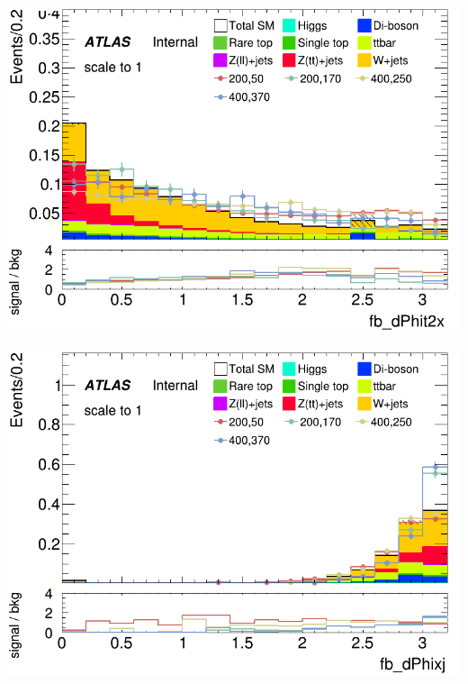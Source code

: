 \documentclass[usenames,dvipsnames]{beamer}
\begin{document}
\begin{frame}
    \begin{minipage}{0.32\textwidth}
        \centering
        \includegraphics[width=\textwidth]{graphics/LH_met_sig/LH_fb_dPhit2x_norm.png}
    \end{minipage}
    \hfill
    \begin{minipage}{0.32\textwidth}
        \centering
        \includegraphics[width=\textwidth]{graphics/LH_met_sig/LH_fb_dPhixj_norm.png}
    \end{minipage}
    \hfill
    \begin{minipage}{0.32\textwidth}
        \centering

\end{minipage}
\end{frame}
\end{document}
